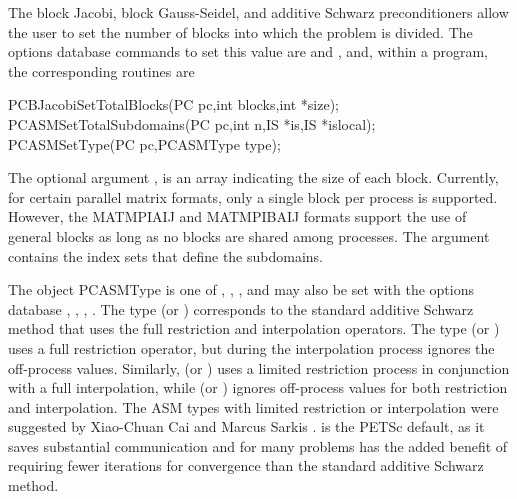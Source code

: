The block Jacobi, block Gauss-Seidel, and additive Schwarz
preconditioners allow the user
to set the number of blocks into which the problem is divided.  The
options database commands to set this value are  
and  , and, within a program, the corresponding routines
are  
 
\begin{tabbing}
  PCBJacobiSetTotalBlocks(PC pc,int blocks,int *size);\\
  PCASMSetTotalSubdomains(PC pc,int n,IS *is,IS *islocal);\\
  PCASMSetType(PC pc,PCASMType type);
\end{tabbing}
The
optional argument , is an array indicating the size of
each block. Currently, for certain parallel matrix formats, only a
single block per process is supported. However, the MATMPIAIJ and
MATMPIBAIJ formats
support the use of general blocks as long as no blocks are shared
among processes. The  argument contains the index sets that
define the subdomains.

The object PCASMType is one of ,
, , 
and may also be set with the options database
 \trl{[basic}, , , \trl{none]}.
  
  
The type  (or  ) corresponds to the
standard additive Schwarz method that uses the full restriction and
interpolation operators.
The type  (or  ) uses a full
restriction operator, but during the interpolation process ignores the off-process
values.
Similarly,  (or  ) uses a limited
restriction process in conjunction with a full interpolation, while
 (or  ) ignores off-process values
for both restriction and interpolation.
The ASM types with limited restriction or interpolation were suggested by
Xiao-Chuan Cai and Marcus Sarkis \cite{cs97a}.    
 is the PETSc default, as it saves substantial communication
and for many problems has the added benefit of requiring fewer iterations for convergence
than the standard additive Schwarz method.

